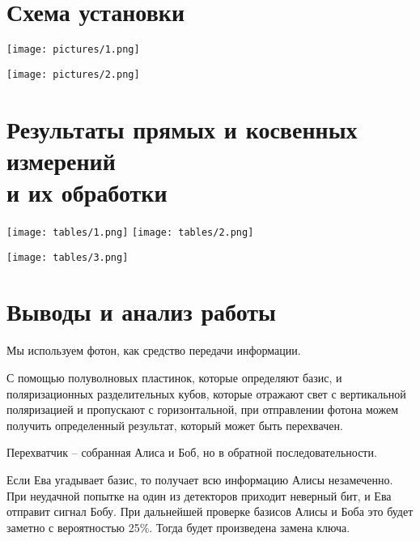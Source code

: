 \documentclass[12pt, a4paper]{article}
\begin{document}
\section{Схема установки}
\texttt{[image: pictures/1.png]}

\texttt{[image: pictures/2.png]}


\section{Результаты прямых и косвенных измерений\\ и их обработки}

\texttt{[image: tables/1.png]}
\texttt{[image: tables/2.png]}

\texttt{[image: tables/3.png]}

\section{Выводы и анализ работы}

 Мы используем фотон, как средство передачи информации.
 
 С помощью полуволновых пластинок, которые определяют базис, и поляризационных разделительных кубов, которые отражают свет с вертикальной поляризацией и пропускают с горизонтальной, при отправлении фотона можем получить определенный результат, который может быть перехвачен.

Перехватчик -- собранная Алиса и Боб, но в обратной последовательности.

Если Ева угадывает базис, то получает всю информацию Алисы незамеченно. 
При неудачной попытке на один из детекторов приходит неверный бит, и Ева отправит сигнал Бобу. При дальнейшей проверке базисов Алисы и Боба это будет заметно с вероятностью 25\%. Тогда будет произведена замена ключа.
\end{document}

